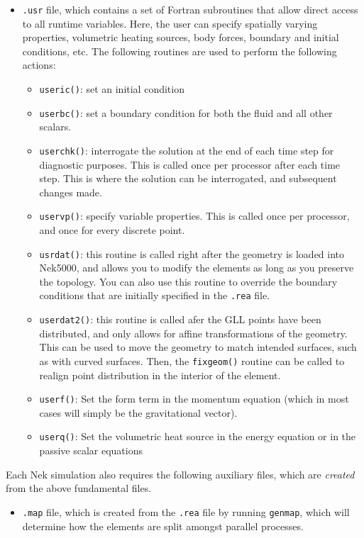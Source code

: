 \documentclass[10pt]{article}
\numberwithin{equation}{section} %
\begin{document}
\begin{itemize}
\item {\tt .usr} file, which contains a set of Fortran subroutines that allow direct access to all runtime variables. Here, the user can specify spatially varying properties, volumetric heating sources, body forces, boundary and initial conditions, etc. The following routines are used to perform the following actions:
	\begin{itemize}
	\item {\tt useric()}: set an initial condition
	\item {\tt userbc()}: set a boundary condition for both the fluid and all other scalars. 
	\item {\tt userchk()}: interrogate the solution at the end of each time step for diagnostic purposes. This is called once per processor after each time step. This is where the solution can be interrogated, and subsequent changes made.
	\item {\tt uservp()}: specify variable properties. This is called once per processor, and once for every discrete point.
	\item {\tt usrdat()}: this routine is called right after the geometry is loaded into Nek5000, and allows you to modify the elements as long as you preserve the topology. You can also use this routine to override the boundary conditions that are initially specified in the {\tt .rea} file. 
	\item {\tt userdat2()}: this routine is called afer the GLL points have been distributed, and only allows for affine transformations of the geometry. This can be used to move the geometry to match intended surfaces, such as with curved surfaces. Then, the {\tt fixgeom()} routine can be called to realign point distribution in the interior of the element.
	\item {\tt userf()}: Set the form term in the momentum equation (which in most cases will simply be the gravitational vector). 
	\item {\tt userq()}: Set the volumetric heat source in the energy equation or in the passive scalar equations
	\end{itemize}
\end{itemize}

Each Nek simulation also requires the following auxiliary files, which are {\it created} from the above fundamental files.

\begin{itemize}
\item {\tt .map} file, which is created from the {\tt .rea} file by running {\tt genmap}, which will determine how the elements are split amongst parallel processes. 
\end{itemize}
\end{document}
